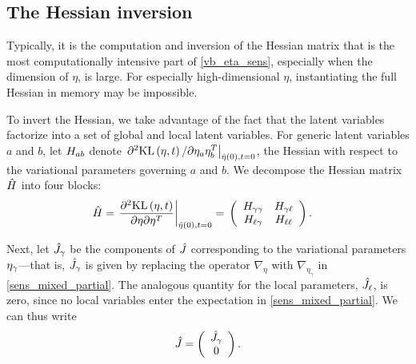 


\subsection{The Hessian inversion}

Typically, it is the computation and inversion of the Hessian matrix that is
the most computationally intensive part of \eqref{vb_eta_sens}, especially when
the dimension of $\eta$, is large.
For especially high-dimensional $\eta$,
instantiating the full Hessian in memory
may be impossible.

To invert the Hessian, we take advantage of the fact that the latent variables
factorize into a set of global and local latent variables.
For generic latent variables $a$ and $b$,
let $H_{ab}$ denote $\left.\partial^2 \mathrm{KL}\left(\eta, t\right) / \partial \eta_a
\eta_b^T\right|_{\hat\eta(0), t=0}$, the Hessian with respect to the variational
parameters governing $a$ and $b$.
We decompose the Hessian matrix $\hat{H}$ into four blocks:
%
\begin{align*}
%
\hessopt =
\fracat{\partial^2 \KL{\eta, \t}}
       {\partial \eta \partial \eta^T}
       {\etaopt(0), t= 0} ={}&
\left(
\begin{array}{cc}
   \hess{\gamma\gamma} & \hess{\gamma\ell} \\
   \hess{\ell\gamma}     & \hess{\ell\ell} \\
\end{array}
\right).
%
\end{align*}

Next, let $\hat J_\gamma$ be the components of
$\hat J$ corresponding to the variational parameters
$\eta_{\gamma}$---that is, $\hat J_\gamma$ is given by replacing
the operator $\nabla_\eta$ with $\nabla_{\eta_\gamma}$ in \eqref{sens_mixed_partial}.
The analogous quantity for the local parameters, $\hat J_\ell$,
is zero, since no local variables enter the expectation in \eqref{sens_mixed_partial}.
We can thus write
\begin{align*}
  \hat J = \left( \begin{array}{c} \hat J_\gamma \\ 0 \end{array}\right).
\end{align*}

